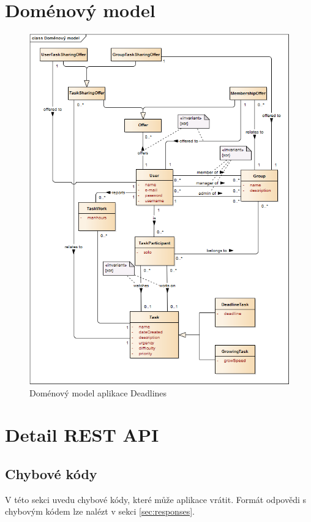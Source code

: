 \documentclass[thesis=B,czech]{FITthesis}[2012/06/26]
\begin{document}
\chapter{Doménový model}
	\begin{figure}\centering
		\includegraphics[width=1\textwidth]{ea-diagrams/domain-model.png}
		\caption[Doménový model]{Doménový model aplikace Deadlines}
		\label{diagram:domain-model}
	\end{figure}

\chapter{Detail REST API}
	\label{appdx:restapi}

	\section{Chybové kódy}
		\label{appdx:rest-error-codes}
		V této sekci uvedu chybové kódy, které může aplikace vrátit. Formát odpovědi s chybovým kódem lze nalézt v sekci \ref{sec:responses}.
		
\end{document}
